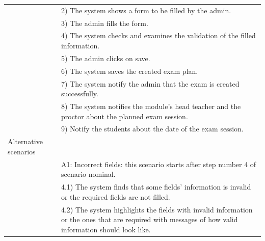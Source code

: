 \documentclass[]{uc2pfecaneva}
\begin{document}
\begin{table}[t]
\begin{tabularx}{\textwidth}{|l|X|}
            & 2) The system shows a form to be filled by the admin.                                                                                                             \\
            & 3) The admin fills the form.                                                                                                                                      \\
            & 4) The system checks and examines the validation of the filled information.                                                                                       \\
            & 5) The admin clicks on save.                                                                                                                                      \\
            & 6) The system saves the created exam plan.                                                                                                                     \\
            & 7) The system notify the admin that the exam is created successfully.                                                                                             \\
            & 8) The system notifies the module's head teacher and the proctor about the planned exam session.                                                                                 \\
            & 9) Notify the students about the date of the exam session.                                                                                                        \\ \hline
            Alternative scenarios &                                                                                                                                                                   \\
            & A1: Incorrect fields: this scenario starts after step number 4 of scenario nominal.                                                                               \\
            & \hspace{4mm}4.1) The system finds that some fields' information is invalid or the required fields are not filled.                                                 \\
            & \hspace{4mm}4.2) The system highlights the fields with invalid information or the ones that are required with messages of how valid information should look like. \\

\end{tabularx}
\end{table}
\end{document}

